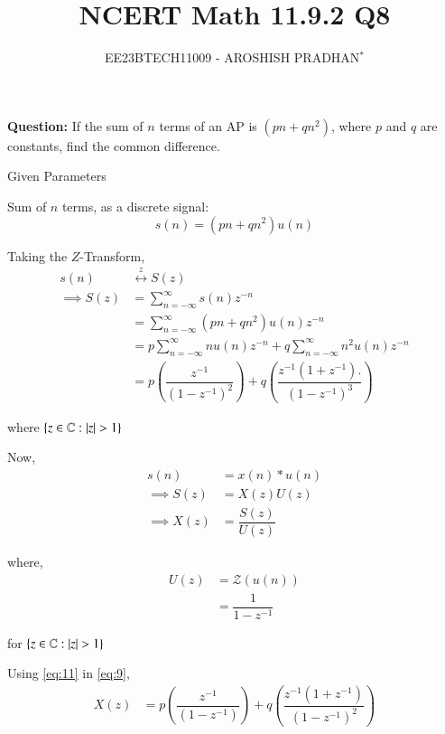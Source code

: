 \documentclass[journal,12pt,twocolumn]{IEEEtran}
\theoremstyle{remark}
\begin{document}

\vspace{3cm}

\title{NCERT Math 11.9.2 Q8}
\author{EE23BTECH11009 - AROSHISH PRADHAN$^{*}$%
}
\maketitle
\newpage
\bigskip
\textbf{Question:} If the sum of $n$ terms of an AP is $(pn + qn^2)$, where $p$ and $q$ are constants, find the common difference.\\

\solution
\begin{table}[!h]
    \centering
    
    \caption{Given Parameters}
    \label{tab:1}
\end{table}

Sum of $n$ terms, as a discrete signal:
\begin{equation}
    s(n) = (pn + qn^2)u(n)
\end{equation}

Taking the $Z$-Transform,
\begin{align}
    s(n) &\overset{z}{\longleftrightarrow} S(z)\\
    \implies S(z) &= \sum_{n = - \infty}^{\infty}s(n)z^{-n}\\
    &= \sum_{n = - \infty}^{\infty}(pn + qn^2)u(n)z^{-n}\\
    &= p\sum_{n = -\infty}^{\infty}nu(n)z^{-n} + q\sum_{n = -\infty}^{\infty}n^2u(n)z^{-n}\\
    &= p\left(\dfrac{z^{-1}}{(1-z^{-1})^2}\right) + q\left(\dfrac{z^{-1}(1 + z^{-1}).}{(1-z^{-1})^3}\right)
\end{align}

where $\{z\in \mathbb{C}: \left\vert z\right\vert > 1\}$

Now, 
\begin{align}
    s(n) &= x(n) \ast u(n)\\
    \implies S(z) &= X(z)U(z)\\
    \implies X(z) &= \dfrac{S(z)}{U(z)}\label{eq:9}
\end{align}

where,
\begin{align}
    U(z) &= \mathcal{Z}(u(n))\\
    &= \dfrac{1}{1 - z^{-1}}\label{eq:11}
\end{align}

for $\{z\in \mathbb{C}: \left\vert z\right\vert > 1\}$

Using \eqref{eq:11} in \eqref{eq:9},
\begin{align}
    X(z) &= p\left(\dfrac{z^{-1}}{(1-z^{-1})}\right) + q\left(\dfrac{z^{-1}(1 + z^{-1})}{(1-z^{-1})^2}\right)
\end{align}
\end{document}
